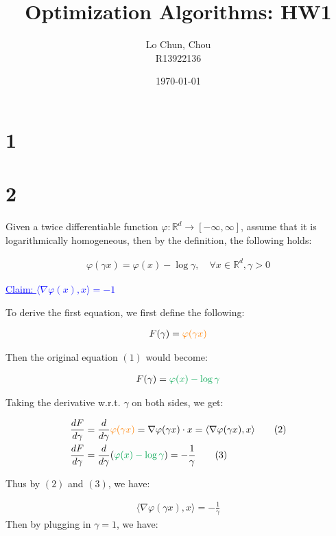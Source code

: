\documentclass{article}
\title{Optimization Algorithms: HW1}
\author{Lo Chun, Chou \\ R13922136}
\date\today
\begin{document}
\setlength{\parindent}{0pt}
\maketitle 

\section*{1}

\section*{2}

Given a twice differentiable function $\varphi: \mathbb{R}^d \to [- \infty, \infty]$, 
assume that it is logarithmically homogeneous, 
then by the definition, the following holds:

\begin{align*}
    \varphi ( \gamma x ) = \varphi (x) - \log \gamma, \quad \forall x \in \mathbb{R}^d, \gamma > 0 \tag{1}
\end{align*}

\textcolor{blue}{\underline{Claim: $\langle \nabla \varphi (x), x \rangle = - 1$ } }
\bigskip

To derive the first equation, we first define the following:

\begin{align*}
    F(\gamma) = \textcolor{orange}{\varphi (\gamma x)}
\end{align*}

Then the original equation $(1)$ would become:

\begin{align*}
    F(\gamma) = \textcolor{Green}{\varphi (x) - \log \gamma}
\end{align*}

Taking the derivative w.r.t. $\gamma$ on both sides, we get:

\begin{align*}
    \frac{dF}{d\gamma} &= \frac{d}{d\gamma} \textcolor{orange}{\varphi (\gamma x)} = \nabla \varphi (\gamma x) \cdot x = \langle \nabla \varphi (\gamma x), x \rangle \tag{2}\\
    \frac{dF}{d\gamma} &= \frac{d}{d\gamma} (\textcolor{Green}{\varphi (x) - \log \gamma}) = - \frac{1}{\gamma} \tag{3}
\end{align*}

Thus by $(2)$ and $(3)$, we have:

\begin{align*}
    \langle \nabla \varphi (\gamma x), x \rangle = - \frac{1}{\gamma}
\end{align*}
Then by plugging in $\gamma = 1$, we have:
\end{document}
